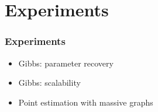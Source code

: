 \documentclass[final,hyperref={pdfpagelabels=false},noamsthm]{beamer}
\newcommand{\bfT}{\mathbf{T}}
\newcommand{\bfPsi}{\boldsymbol{\Psi}}
\begin{document}
%
%
%
%
%


\section{Experiments}
\begin{frame}
	\frametitle{Experiments}
	\begin{itemize}
		\item Gibbs: parameter recovery
		\item Gibbs: scalability
		\item Point estimation with massive graphs
	\end{itemize}
\end{frame}
\end{document}
